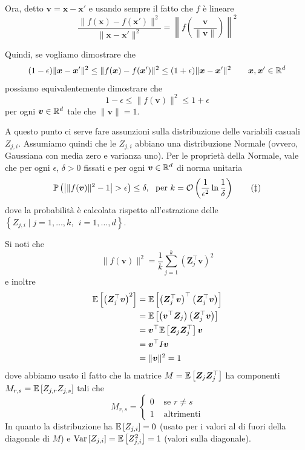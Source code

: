Ora, detto $\bm v = \bm x - \bm x'$ e usando sempre il fatto che $f$ è lineare
$$ \frac{\|f(\bm x) - f(\bm x') \|^2}{\|\bm x - \bm x'\|^2} = \left\|f\left(\frac{\bm v}{\|\bm v\|}\right)\right\|^2 $$

Quindi, se vogliamo dimostrare che
$$ (1 - \epsilon) \| \bm x - \bm x' \|^2 \leq \| f(\bm x) - f (\bm x') \|^2 \leq (1 + \epsilon) \|\bm x - \bm x'\|^2 \qquad \bm x, \bm x' \in \mathbb{R}^d $$
possiamo equivalentemente dimostrare che
$$1 - \epsilon \leq \|f(\bm v)\|^2 \leq 1 + \epsilon$$
per ogni $\bm v \in \mathbb{R}^d$ tale che $\|\bm v\| = 1$.

A questo punto ci serve fare assunzioni sulla distribuzione delle variabili casuali $Z_{j,i}$. Assumiamo  quindi che le $Z_{j,i}$ abbiano una distribuzione Normale (ovvero, Gaussiana con media zero e varianza uno). Per le proprietà della Normale, vale che per ogni $\epsilon$, $\delta > 0$ fissati e per ogni $\bm v \in \mathbb{R}^d$ di norma unitaria
\[ \mathbb{P} \left( \left| \|f(\bm v) \|^2 - 1 \right| > \epsilon \right) \leq \delta, \ \text{ per } k = \mathcal{O} \left(\frac{1}{\epsilon^2} \ln \frac{1}{\delta} \right) \tag*{($\ddag$)} \]
dove la probabilità è calcolata rispetto all'estrazione delle $\left\{Z_{j,i} \mid j = 1, \dots, k, \ \ i = 1, \dots, d\right\}$.

Si noti che
$$ \|f(\bm v) \|^2 = \frac{1}{k} \sum_{j = 1}^k \left(\bm Z_j^\top \bm v\right)^2 $$
e inoltre
\begin{align*}
    \mathbb{E} \left[\left(\bm Z_j^\top \bm v \right)^2 \right] & = \mathbb{E} \left[\left(\bm Z_j^\top \bm v\right)^\top \left(\bm Z_j^\top \bm v\right)\right] \\
    & = \mathbb{E} \left[ \left(\bm v^\top \bm Z_j\right) \left(\bm Z_j^\top \bm v\right)\right] \\
    & = \bm v^\top \mathbb{E} \left[\bm Z_j \bm Z_j^\top \right] \bm v \\
    & = \bm v^\top I \bm v \\
    & = \|\bm v \|^2 = 1
\end{align*}
dove abbiamo usato il fatto che la matrice $M = \mathbb{E} \left[\bm Z_j \bm Z_j^\top \right]$ ha componenti $M_{r,s} = \mathbb{E}\left[Z_{j,r} Z_{j,s}\right]$ tali che
$$ M_{r,s} = \begin{cases}
    0 & \text{ se } r \neq s \\ 1 & \text{ altrimenti}
\end{cases}$$
In quanto la distribuzione ha $\mathbb{E}\left[Z_{j,i}\right] = 0$ (usato per i valori al di fuori della diagonale di $M$) e $\textnormal{Var} \left[Z_{j,i}\right] = \mathbb{E} \left[Z_{j,i}^2\right] = 1$ (valori sulla diagonale).

